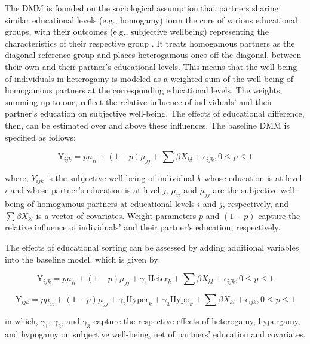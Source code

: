 The DMM is founded on the sociological assumption that partners sharing similar educational levels (e.g., homogamy) form the core of various educational groups, with their outcomes (e.g., subjective wellbeing) representing the characteristics of their respective group \parencite{sobelDiagonalMobilityModels1981}. It treats homogamous partners as the diagonal reference group and places heterogamous ones off the diagonal, between their own and their partner's educational levels. This means that the well-being of individuals in heterogamy is modeled as a weighted sum of the well-being of homogamous partners at the corresponding educational levels. The weights, summing up to one, reflect the relative influence of individuals' and their partner's education on subjective well-being. The effects of educational difference, then, can be estimated over and above these influences. The baseline DMM is specified as follows:

\begin{equation}
    \label{eq:dmm-chapter3}
    \text{Y}_{ijk} = p \mu_{ii} + (1-p) \mu_{jj} + \sum \beta X_{kl} + \epsilon_{ijk}, 0 \leq p \leq 1
\end{equation}

where, $Y_{ijk}$ is the subjective well-being of individual $k$ whose education is at level $i$ and whose partner's education is at level $j$, $\mu_{ii}$ and $\mu_{jj}$ are the subjective well-being of homogamous partners at educational levels $i$ and $j$, respectively, and $\sum \beta X_{kl}$ is a vector of covariates. Weight parameters $p$ and $(1-p)$ capture the relative influence of individuals' and their partner's education, respectively.

The effects of educational sorting can be assessed by adding additional variables into the baseline model, which is given by:

\begin{equation}
    \label{eq:dmm_heter}
    \text{Y}_{ijk} = p \mu_{ii} + (1-p) \mu_{jj} + \gamma_{1} \text{Heter}_{k} + \sum \beta X_{kl} + \epsilon_{ijk}, 0 \leq p \leq 1
\end{equation}

\begin{equation}
    \label{eq:dmm_hyper}
    \text{Y}_{ijk} = p \mu_{ii} + (1-p) \mu_{jj} + \gamma_{2} \text{Hyper}_{k} + \gamma_{3} \text{Hypo}_{k} + \sum \beta X_{kl} + \epsilon_{ijk}, 0 \leq p \leq 1
\end{equation}

in which, $\gamma_{1}$, $\gamma_{2}$, and $\gamma_{3}$ capture the respective effects of heterogamy, hypergamy, and hypogamy on subjective well-being, net of partners' education and covariates.

